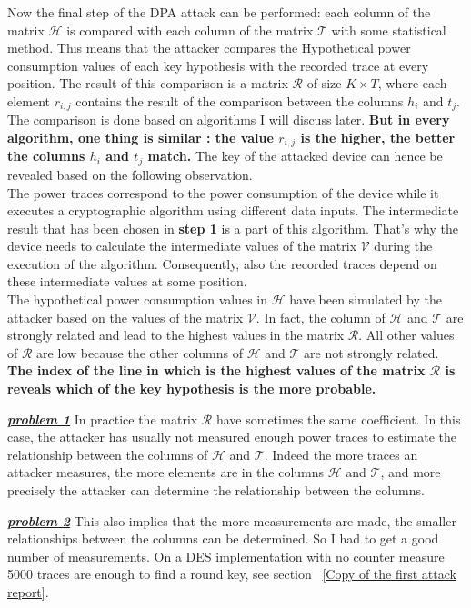 Now the final step of the DPA attack can be performed:
each column of the matrix $\mathcal{H}$ is compared 
with each column of the matrix $\mathcal{T}$ with some
statistical method. This means that the attacker compares 
the Hypothetical power consumption values
of each key hypothesis with the recorded trace at every position.
The result of this comparison is a matrix $\mathcal{R}$ of size  $K \times T$,
 where each element $r_{i,j}$
contains the result of the comparison between the columns 
$h_{i}$ and $t_{j}$. The comparison is done based
on algorithms I will discuss later. \textbf{But in every algorithm, 
one thing is similar : the value $r_{i,j}$ is the
higher, the better the columns $h_{i}$ and $t_{j}$ match.} 
The key of the attacked device can hence be
revealed based on the following observation.\\
\indent The power traces correspond to the power consumption 
of the device while it executes a
cryptographic algorithm using different data inputs. 
The intermediate result that has been chosen in
\textbf{step 1} is a part of this algorithm. 
That's why the device needs to calculate the intermediate
values of the matrix $\mathcal{V}$ during the execution of the algorithm.
Consequently, also the recorded traces depend on these intermediate
values at some position.\\
\indent The hypothetical power consumption values
 in $\mathcal{H}$ have been simulated by the attacker
based on the values of the matrix $\mathcal{V}$. 
In  fact, the column of $\mathcal{H}$ and $\mathcal{T}$ are strongly related and
lead to the highest values in the matrix $\mathcal{R}$. 
All other values of $\mathcal{R}$ are low because
the other columns of  $\mathcal{H}$ and $\mathcal{T}$ are not strongly related.\\
\textbf{ The index of the line in which is the highest values of the matrix $\mathcal{R}$ is
reveals which of the key hypothesis is the more probable.}

\underline{\textbf{\textit{problem 1}}} In practice the matrix $\mathcal{R}$ 
have sometimes the same
coefficient. In this case, the attacker has usually not measured enough power traces to estimate
the relationship between the columns of  $\mathcal{H}$ and $\mathcal{T}$.
Indeed the more traces an attacker measures, the more elements 
are in the columns $\mathcal{H}$ and
 $\mathcal{T}$, and more precisely the attacker can determine the relationship between the columns.

\underline{\textbf{\textit{problem 2}}} This also implies that the more measurements are made,
the smaller relationships between the columns can be determined. 
So I had to get a good number of
measurements. On a DES implementation with no counter measure 5000 traces are 
enough to find a round key, see section ~\ref{Copy of the first attack report}.

